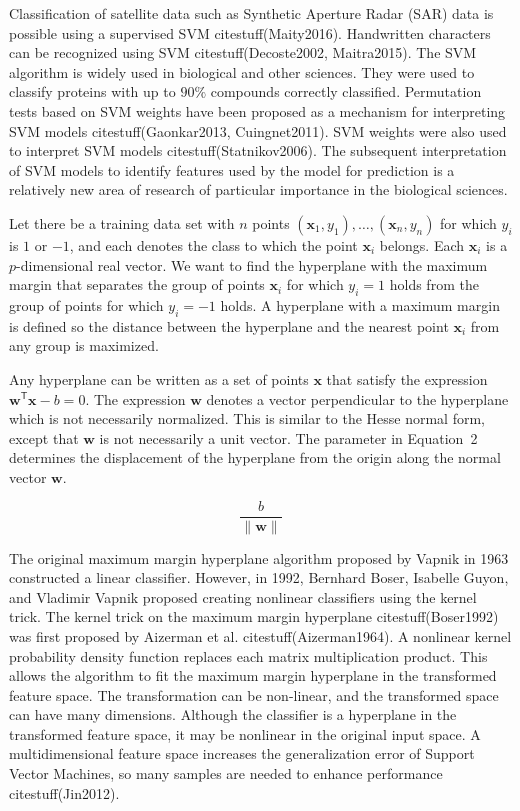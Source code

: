 \documentclass[preprint,12pt]{elsarticle}
\begin{document}
Classification of satellite data such as Synthetic Aperture Radar (SAR) data is possible using a supervised SVM citestuff(Maity2016). Handwritten characters can be recognized using SVM citestuff(Decoste2002, Maitra2015). The SVM algorithm is widely used in biological and other sciences. They were used to classify proteins with up to $90\%$ compounds correctly classified. Permutation tests based on SVM weights have been proposed as a mechanism for interpreting SVM models citestuff(Gaonkar2013, Cuingnet2011). SVM weights were also used to interpret SVM models citestuff(Statnikov2006). The subsequent interpretation of SVM models to identify features used by the model for prediction is a relatively new area of research of particular importance in the biological sciences.

Let there be a training data set with $n$ points $(\mathbf{x}_{1},y_{1}),\ldots,(\mathbf{x}_{n},y_{n})$ for which $y_{i}$ is $1$ or $-1$, and each denotes the class to which the point $\mathbf{x}_{i}$ belongs. Each $\mathbf{x}_{i}$ is a $p$-dimensional real vector. We want to find the hyperplane with the maximum margin that separates the group of points $\mathbf{x}_{i}$ for which $y_{i}=1$ holds from the group of points for which $y_{i}=-1$ holds. A hyperplane with a maximum margin is defined so the distance between the hyperplane and the nearest point $\mathbf{x}_{i}$ from any group is maximized.

Any hyperplane can be written as a set of points $\mathbf{x}$ that satisfy the expression $\mathbf{w}^{\mathsf{T}}\mathbf{x} -b=0$. The expression $\mathbf{w}$ denotes a vector perpendicular to the hyperplane which is not necessarily normalized. This is similar to the Hesse normal form, except that $\mathbf{w}$ is not necessarily a unit vector. The parameter in Equation~2 determines the displacement of the hyperplane from the origin along the normal vector $\mathbf{w}$.

\begin{equation}
	\frac{b}{\|\mathbf{w} \|}
	\label{eqn:2}
\end{equation}

The original maximum margin hyperplane algorithm proposed by Vapnik in 1963 constructed a linear classifier. However, in 1992, Bernhard Boser, Isabelle Guyon, and Vladimir Vapnik proposed creating nonlinear classifiers using the kernel trick. The kernel trick on the maximum margin hyperplane citestuff(Boser1992) was first proposed by Aizerman et al. citestuff(Aizerman1964). A nonlinear kernel probability density function replaces each matrix multiplication product. This allows the algorithm to fit the maximum margin hyperplane in the transformed feature space. The transformation can be non-linear, and the transformed space can have many dimensions. Although the classifier is a hyperplane in the transformed feature space, it may be nonlinear in the original input space. A multidimensional feature space increases the generalization error of Support Vector Machines, so many samples are needed to enhance performance citestuff(Jin2012). 
\end{document}
